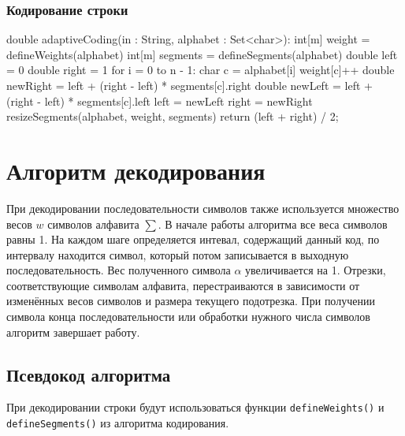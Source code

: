 \documentclass[12pt]{article}
\begin{document}
\subsubsection*{Кодирование строки}
\begin{listing}{1}
double adaptiveCoding(in : String, alphabet : Set<char>):
    int[m] weight = defineWeights(alphabet)
    int[m] segments = defineSegments(alphabet)
    double left = 0
    double right = 1
    for i = 0 to n - 1:
        char c = alphabet[i]
        weight[c]++
        double newRight = left + (right - left) * segments[c].right
        double newLeft = left + (right - left) * segments[c].left
        left = newLeft
        right = newRight
        resizeSegments(alphabet, weight, segments)
    return (left + right) / 2;
\end{listing}

\section*{Алгоритм декодирования}
При декодировании последовательности символов также используется множество весов $w$ символов алфавита $\sum$. В начале работы алгоритма все веса символов равны 1.  На каждом шаге определяется интевал, содержащий данный код, по интервалу находится символ, который потом записывается в выходную последовательность. Вес полученного символа $\alpha$ увеличивается на 1. Отрезки, соответствующие символам алфавита, перестраиваются в зависимости от изменённых весов символов и размера текущего подотрезка. При получении символа конца последовательности или обработки нужного числа символов алгоритм завершает работу.

\subsection*{Псевдокод алгоритма}
При декодировании строки будут использоваться функции \verb'defineWeights()' и \verb'defineSegments()' из алгоритма кодирования.
\end{document}
